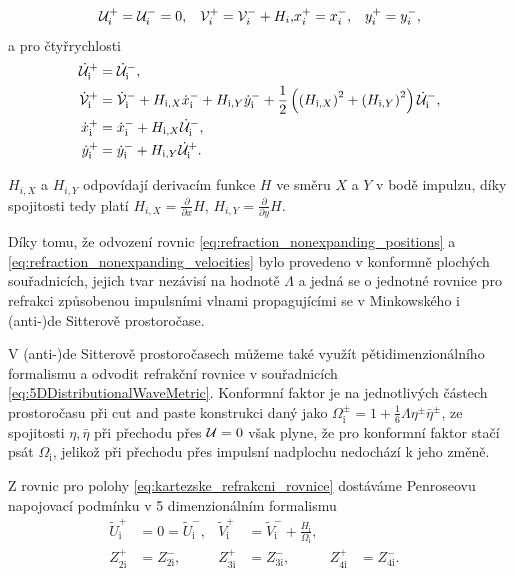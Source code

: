\begin{align}
    \label{eq:kartezske_refrakcni_rovnice}
        \mathcal{U}_i^{+} &= \mathcal{U}_i^{-} = 0, & 
        \mathcal{V}_i^{+} = \mathcal{V}_i^{-} + H_i, &
        x_i^{+} = x_i^{-}, & 
        y_i^{+} = y_i^{-},
\end{align}
a pro čtyřrychlosti
\begin{equation}
    \label{eq:refraction_velocity_null_cart}
    \begin{split}
        \dot {\mathcal{U}}_{\mathrm{i}}^{+} &= \dot {\mathcal{U}}_{\mathrm{i}}^{-}, \\
        \dot {\mathcal{V}}_{\mathrm{i}}^{+} &= \dot {\mathcal{V}}_{\mathrm{i}}^{-} + H_{\mathrm{i}, X} \dot x_{\mathrm{i}}^{-} + H_{\mathrm{i}, Y} \dot y_{\mathrm{i}}^{-} + \frac{1}{2}\left(\left(H_{\mathrm{i}, X}\right)^2 + \left(H_{\mathrm{i}, Y}\right)^2\right) \dot {\mathcal{U}}_{\mathrm{i}}^{-}, \\
        \dot x_{\mathrm{i}}^{+} &= \dot x_{\mathrm{i}}^{-} + H_{\mathrm{i}, X} \dot {\mathcal{U}}_{\mathrm{i}}^{-}, \\
        \dot y_{\mathrm{i}}^{+} &= \dot y_{\mathrm{i}}^{-} + H_{\mathrm{i}, Y} \dot {\mathcal{U}}_{\mathrm{i}}^{+}.
    \end{split}
\end{equation}

$H_{i,X}$ a $H_{i, Y}$ odpovídají derivacím funkce $H$ ve směru $X$ a $Y$ v bodě impulzu, díky spojitosti tedy platí
$H_{i,X} = \frac{\partial}{\partial x} H$, $H_{i,Y} = \frac{\partial}{\partial y} H$.

Díky tomu, že odvození rovnic \eqref{eq:refraction_nonexpanding_positions} a \eqref{eq:refraction_nonexpanding_velocities} bylo provedeno v konformně plochých souřadnicích,
jejich tvar nezávisí na hodnotě $\Lambda$ a jedná se o jednotné rovnice pro refrakci způsobenou impulsními vlnami propagujícími se v
Minkowského i (anti-)de Sitterově prostoročase.

V (anti-)de Sitterově prostoročasech můžeme také využít pětidimenzionálního formalismu a odvodit refrakční rovnice v souřadnicích \eqref{eq:5DDistributionalWaveMetric}.
Konformní faktor je na jednotlivých částech prostoročasu při cut and paste konstrukci daný jako $\Omega^{\pm}_{\mathrm{i}} = 1 + \frac{1}{6} \Lambda \eta^{\pm} \bar{\eta}^{\pm}$,
ze spojitosti $\eta, \bar{\eta}$ při přechodu přes $\mathcal{U}=0$
však plyne, že pro konformní faktor stačí psát $\Omega_{\mathrm{i}}$, jelikož při přechodu přes impulsní nadplochu nedochází k jeho změně.

Z rovnic pro polohy \eqref{eq:kartezske_refrakcni_rovnice} dostáváme Penroseovu napojovací podmínku v 5 dimenzionálním formalismu
\begin{align}
        \tilde{U}^{+}_\mathrm{i} &= 0 = \tilde{U}^{-}_\mathrm{i}, &
        \tilde{V}^{+}_\mathrm{i} &= \tilde{V}^{-}_\mathrm{i} + \frac{H_\mathrm{i}}{\Omega_\mathrm{i}}, \nonumber \\
        Z^{+}_{2\mathrm{i}} &= Z^{-}_{2\mathrm{i}}, &
        Z^{+}_{3\mathrm{i}} &= Z^{-}_{3\mathrm{i}}, &
        Z^{+}_{4\mathrm{i}} &= Z^{-}_{4\mathrm{i}}.  &
\end{align}

